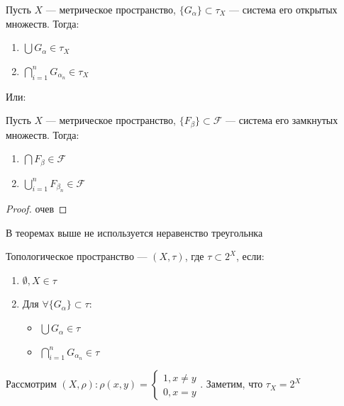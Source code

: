 \begin{theorem}
    Пусть \(X\) --- метрическое пространство, \(\{G_\alpha\} \subset \tau_X\) --- система его открытых множеств. Тогда:
    \begin{enumerate}
        \item \(\bigcup G_\alpha \in \tau_X\)
        \item \(\bigcap_{i = 1}^n G_{\alpha_n} \in \tau_X\)
    \end{enumerate}

    Или:

    Пусть \(X\) --- метрическое пространство, \(\{F_\beta\} \subset \mathcal{F}\) --- система его замкнутых множеств. Тогда:
    \begin{enumerate}
        \item \(\bigcap F_\beta \in \mathcal{F}\)
        \item \(\bigcup_{i = 1}^n F_{\beta_n} \in \mathcal{F}\)
    \end{enumerate}
\end{theorem}
\begin{proof}
    очев
\end{proof}

\begin{note}
    В теоремах выше не используется неравенство треугольнка
\end{note}

\begin{definition}
    Топологическое пространство --- \((X, \tau)\), где \(\tau \subset 2^X\), если:
    \begin{enumerate}
        \item \(\emptyset, X \in \tau\)
        \item Для \(\forall \{G_\alpha\} \subset \tau\):
        \begin{itemize}
            \item \(\bigcup G_\alpha \in \tau\)
            \item \(\bigcap_{i = 1}^n G_{\alpha_n} \in \tau\)
        \end{itemize}
    \end{enumerate}
\end{definition}

\begin{example}
    Рассмотрим \((X, \rho): \rho(x, y) = \left\{\begin{array}{l}
        1, x \ne y \\
        0, x = y
    \end{array}\right.\). Заметим, что \(\tau_X = 2^X\)
\end{example}

